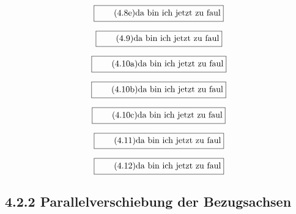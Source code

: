 \documentclass[11pt]{article}
\newcommand{\1}{ {\mathds{1}} }
\begin{document}
    \begin{equation}
      \boxed{
        \tag{4.8e}
        \begin{split}
          \text{da bin ich jetzt zu faul}
        \end{split}
      }
    \end{equation}

    \begin{equation}
      \boxed{
        \tag{4.9}
        \begin{split}
          \text{da bin ich jetzt zu faul}
        \end{split}
      }
    \end{equation}

    \begin{equation}
      \boxed{
        \tag{4.10a}
        \begin{split}
          \text{da bin ich jetzt zu faul}
        \end{split}
      }
    \end{equation}

    \begin{equation}
      \boxed{
        \tag{4.10b}
        \begin{split}
          \text{da bin ich jetzt zu faul}
        \end{split}
      }
    \end{equation}

    \begin{equation}
      \boxed{
        \tag{4.10c}
        \begin{split}
          \text{da bin ich jetzt zu faul}
        \end{split}
      }
    \end{equation}

    \begin{equation}
      \boxed{
        \tag{4.11}
        \begin{split}
          \text{da bin ich jetzt zu faul}
        \end{split}
      }
    \end{equation}

    \begin{equation}
      \boxed{
        \tag{4.12}
        \begin{split}
          \text{da bin ich jetzt zu faul}
        \end{split}
      }
    \end{equation}

    \subsection*{4.2.2 Parallelverschiebung der Bezugsachsen}
\end{document}
